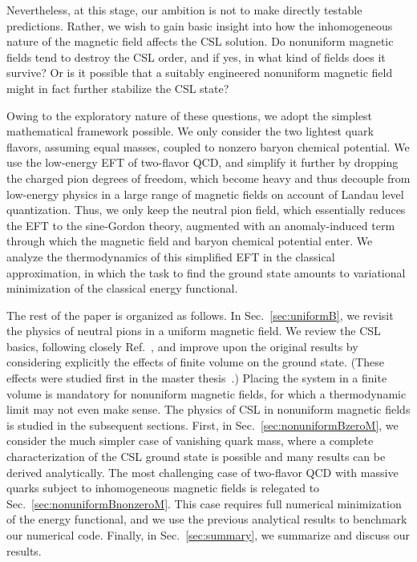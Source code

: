 \documentclass[pdflatex,iicol,sn-mathphys-num]{sn-jnl}
\providecommand{\DIFaddend}{} %
\begin{document}
\DIFaddend Nevertheless, at this stage, our ambition is not to make directly testable predictions. Rather, we wish to gain basic insight into how the inhomogeneous nature of the magnetic field affects the CSL solution. Do nonuniform magnetic fields tend to destroy the CSL order, and if yes, in what kind of fields does it survive? Or is it possible that a suitably engineered nonuniform magnetic field might in fact further stabilize the CSL state?

Owing to the exploratory nature of these questions, we adopt the simplest mathematical framework possible. We only consider the two lightest quark flavors, assuming equal masses, coupled to nonzero baryon chemical potential. We use the low-energy EFT of two-flavor QCD, and simplify it further by dropping the charged pion degrees of freedom, which become heavy and thus decouple from low-energy physics in a large range of magnetic fields on account of Landau level quantization. Thus, we only keep the neutral pion field, which essentially reduces the EFT to the sine-Gordon theory, augmented with an anomaly-induced term through which the magnetic field and baryon chemical potential enter. We analyze the thermodynamics of this simplified EFT in the classical approximation, in which the task to find the ground state amounts to variational minimization of the classical energy functional.

The rest of the paper is organized as follows. In Sec.~\ref{sec:uniformB}, we revisit the physics of neutral pions in a uniform magnetic field. We review the CSL basics, following closely Ref.~\cite{Brauner:2016pko}, and improve upon the original results by considering explicitly the effects of finite volume on the ground state. (These effects were studied first in the master thesis~\cite{Kar2022}.) Placing the system in a finite volume is mandatory for nonuniform magnetic fields, for which a thermodynamic limit may not even make sense.  The physics of CSL in nonuniform magnetic fields is studied in the subsequent sections. First, in Sec.~\ref{sec:nonuniformBzeroM}, we consider the much simpler case of vanishing quark mass, where a complete characterization of the CSL ground state is possible and many results can be derived analytically. The most challenging case of two-flavor QCD with massive quarks subject to inhomogeneous magnetic fields is relegated to Sec.~\ref{sec:nonuniformBnonzeroM}. This case requires full numerical minimization of the energy functional, and we use the previous analytical results to benchmark our numerical code. Finally, in Sec.~\ref{sec:summary}, we summarize and discuss our results.
\end{document}
